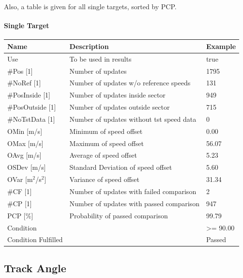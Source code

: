 Also, a table is given for all single targets, sorted by PCP.

\paragraph{Single Target}

\begin{center}
 \begin{table}[H]
  \begin{tabularx}{\textwidth}{ | l | X |  l | }
    \hline
    \textbf{Name} & \textbf{Description} & \textbf{Example} \\ \hline
    Use & To be used in results & true \\ \hline
    \#Pos [1] & Number of updates & 1795 \\ \hline
    \#NoRef [1] & Number of updates w/o reference speeds & 131 \\ \hline
    \#PosInside [1] & Number of updates inside sector & 949 \\ \hline
    \#PosOutside [1] & Number of updates outside sector & 715 \\ \hline
    \#NoTstData [1] & Number of updates without tst speed data & 0 \\ \hline
    OMin [m/s] & Minimum of speed offset & 0.00 \\ \hline
    OMax [m/s] & Maximum of speed offset & 56.07 \\ \hline
    OAvg [m/s] & Average of speed offset & 5.23 \\ \hline
    OSDev [m/s] & Standard Deviation of speed offset & 5.60 \\ \hline
    OVar [m$^2$/s$^2$] & Variance of speed offset & 31.34 \\ \hline
    \#CF [1] & Number of updates with failed comparison & 2 \\ \hline
    \#CP [1] & Number of updates with  passed comparison & 947 \\ \hline
    PCP [\%] & Probability of passed comparison & 99.79 \\ \hline
    Condition &  & >= 90.00 \\ \hline
    Condition Fulfilled &  & Passed \\ \hline
\end{tabularx}
\end{table}
\end{center}

\subsection{Track Angle}
\label{sec:eval_req_track_angle} 

